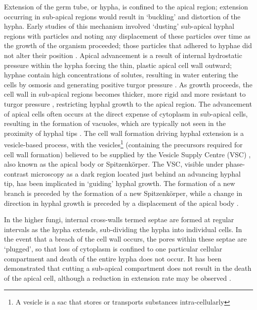Extension of the germ tube, or hypha, is confined to the apical region; extension occurring in sub-apical regions would result in \lq buckling' and distortion of the hypha. Early studies of this mechanism involved \lq dusting' sub-apical hyphal regions with particles and noting any displacement of these particles over time as the growth of the organism proceeded; those particles that adhered to hyphae did not alter their position \cite{carlile2001}. Apical advancement is a result of internal hydrostatic pressure within the hypha forcing the thin, plastic apical cell wall outward; hyphae contain high concentrations of solutes, resulting in water entering the cells by osmosis and generating positive turgor pressure \cite{gow1995}. As growth proceeds, the cell wall in sub-apical regions becomes thicker, more rigid and more resistant to turgor pressure \cite{ruiz-herrera1991}, restricting hyphal growth to the apical region. The advancement of apical cells often occurs at the direct expense of cytoplasm in sub-apical cells, resulting in the formation of vacuoles, which are typically not seen in the proximity of hyphal tips \cite{paul1998}. The cell wall formation driving hyphal extension is a vesicle-based process, with the vesicles\footnote{A vesicle is a sac that stores or transports substances intra-cellularly} (containing the precursors required for cell wall formation) believed to be supplied by the Vesicle Supply Centre (VSC) \cite{bartnicki-garcia1989}, also known as the apical body or Spitzenk\"{o}rper. The VSC, visible under phase-contrast microscopy as a dark region located just behind an advancing hyphal tip, has been implicated in \lq guiding' hyphal growth. The formation of a new branch is preceded by the formation of a new Spitzenk\"{o}rper, while a change in direction in hyphal growth is preceded by a displacement of the apical body \cite{carlile2001}.

In the higher fungi, internal cross-walls termed septae are formed at regular intervals as the hypha extends, sub-dividing the hypha into individual cells. In the event that a breach of the cell wall occurs, the pores within these septae are \lq plugged', so that loss of cytoplasm is confined to one particular cellular compartment and death of the entire hypha does not occur. It has been demonstrated that cutting a sub-apical compartment does not result in the death of the apical cell, although a reduction in extension rate may be observed \cite{trinci1971}.

